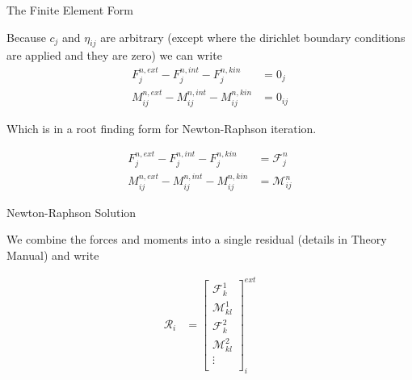 \documentclass[11pt]{beamer}
\begin{document}
\begin{frame}{The Finite Element Form}

Because $c_j$ and $\eta_{ij}$ are arbitrary (except where the dirichlet boundary conditions are applied and they are zero) we can write
\begin{align*}
F_{j}^{n,ext} - F_{j}^{n,int} - F_{j}^{n,kin} &= 0_j\\
M_{ij}^{n,ext} - M_{ij}^{n,int} - M_{ij}^{n,kin} &= 0_{ij}
\end{align*}

Which is in a root finding form for Newton-Raphson iteration.

\begin{equation}
\begin{aligned}
F_{j}^{n,ext} - F_{j}^{n,int} - F_{j}^{n,kin} &= \mathcal{F}_j^n\\
M_{ij}^{n,ext} - M_{ij}^{n,int} - M_{ij}^{n,kin} &= \mathcal{M}_{ij}^n
\end{aligned}
\label{eqn:residual_form}
\end{equation}


\end{frame}

\begin{frame}{Newton-Raphson Solution}

We combine the forces and moments into a single residual (details in Theory Manual) and write

\begin{equation}
\begin{aligned}
\mathcal{R}_i &= \left[\begin{array}{c}
\mathcal{F}_k^1\\
\mathcal{M}_{kl}^1\\
\mathcal{F}_k^2\\
\mathcal{M}_{kl}^2\\
\vdots\\
\end{array}\right]_i^{ext}
\end{aligned}
\end{equation}

\end{frame}

%
%
%
\end{document}
